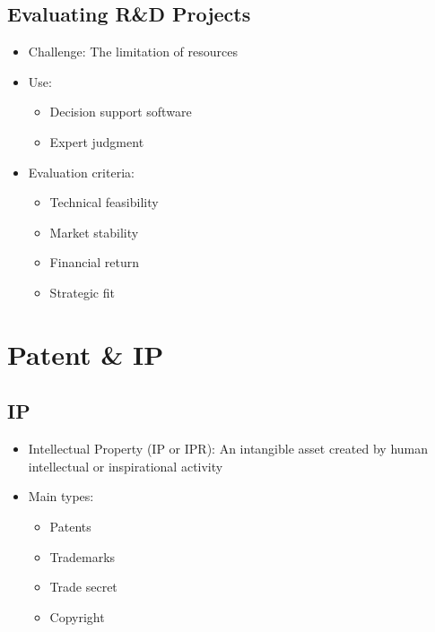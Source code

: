 \documentclass[openany,12pt,a4paper]{book}
\begin{document}
\section{Evaluating R\&D Projects}
\begin{itemize}
    \item Challenge: The limitation of resources
    \item Use:
    \begin{itemize}
        \item Decision support software
        \item Expert judgment
    \end{itemize}
    \item Evaluation criteria:
    \begin{itemize}
        \item Technical feasibility
        \item Market stability
        \item Financial return
        \item Strategic fit
    \end{itemize}
\end{itemize}

\chapter{Patent \& IP}
\section{IP}
\begin{itemize}
    \item Intellectual Property (IP or IPR): An intangible asset created by human intellectual or inspirational activity
    \item Main types:
    \begin{itemize}
        \item Patents
        \item Trademarks
        \item Trade secret
        \item Copyright
    \end{itemize}
\end{itemize}
\end{document}
